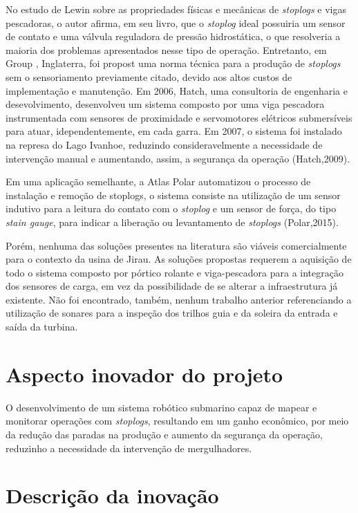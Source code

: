 No estudo de Lewin \cite{jack} sobre as propriedades físicas e mecânicas de 
\textit{stoplogs} e vigas pescadoras, o autor afirma, em seu livro, que o
\textit{stoplog} ideal possuiria um sensor de contato e uma válvula reguladora
de pressão hidrostática, o que resolveria a maioria dos problemas apresentados
nesse tipo de operação. Entretanto, em Group \cite{pinc}, Inglaterra, foi
propost uma norma técnica para a produção de \textit{stoplogs} sem o sensoriamento
previamente citado, devido aos altos custos de implementação e manutenção. Em
2006, Hatch, uma consultoria de engenharia e desevolvimento,
desenvolveu um sistema composto por uma viga pescadora instrumentada com sensores de
proximidade e servomotores elétricos submersíveis para atuar, idependentemente,
em cada garra. Em 2007, o sistema foi instalado na represa do Lago Ivanhoe,
reduzindo consideravelmente a necessidade de intervenção manual e aumentando,
assim, a segurança da operação (Hatch,2009)\cite{hatch}.

Em uma aplicação semelhante, a Atlas Polar automatizou o processo
de instalação e remoção de stoplogs, o sistema consiste na utilização de um sensor indutivo para a
leitura do contato com o \textit{stoplog} e um sensor de força, do tipo
\textit{stain gauge}, para indicar a liberação ou levantamento de
\textit{stoplogs} (Polar,2015)\cite{atlas}.

Porém, nenhuma das soluções presentes na literatura são viáveis comercialmente
para o contexto da usina de Jirau. As soluções propostas requerem a aquisição de todo o
sistema composto por pórtico rolante e viga-pescadora para a integração dos
sensores de carga, em vez da possibilidade de se alterar a infraestrutura já
existente.
Não foi encontrado, também, nenhum trabalho anterior referenciando a utilização
de sonares para a inspeção dos trilhos guia e da soleira da entrada e saída da turbina.

\section{Aspecto inovador do projeto}

O desenvolvimento de um sistema robótico submarino capaz de mapear e monitorar
operações com \textit{stoplogs}, resultando em um ganho econômico, por meio da
redução das paradas na produção e aumento da segurança da operação,
reduzinho a necessidade da intervenção de mergulhadores.

\section{Descrição da inovação}

